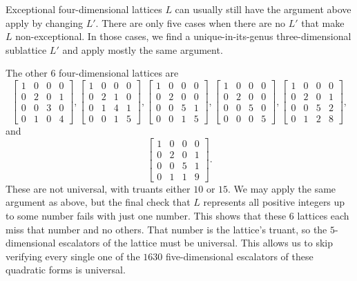 \documentclass{article}
\begin{document}
Exceptional four-dimensional lattices $L$ can usually still have the argument above apply by changing $L'$. There are only five cases when there are no $L'$ that make $L$ non-exceptional. In those cases, we find a unique-in-its-genus three-dimensional sublattice $L'$ and apply mostly the same argument.

The other $6$ four-dimensional lattices are
\[\begin{bmatrix} 1 & 0 & 0 & 0 \\ 0 & 2 & 0 & 1 \\ 0 & 0 & 3 & 0 \\ 0 & 1 & 0 & 4 \end{bmatrix}, \begin{bmatrix} 1 & 0 & 0 & 0 \\ 0 & 2 & 1 & 0 \\ 0 & 1 & 4 & 1 \\ 0 & 0 & 1 & 5 \end{bmatrix}, \begin{bmatrix} 1 & 0 & 0 & 0 \\ 0 & 2 & 0 & 0 \\ 0 & 0 & 5 & 1 \\ 0 & 0 & 1 & 5 \end{bmatrix}, \begin{bmatrix} 1 & 0 & 0 & 0 \\ 0 & 2 & 0 & 0 \\ 0 & 0 & 5 & 0 \\ 0 & 0 & 0 & 5 \end{bmatrix}, \begin{bmatrix} 1 & 0 & 0 & 0 \\ 0 & 2 & 0 & 1 \\ 0 & 0 & 5 & 2 \\ 0 & 1 & 2 & 8 \end{bmatrix},\]
and
\[\begin{bmatrix} 1 & 0 & 0 & 0 \\ 0 & 2 & 0 & 1 \\ 0 & 0 & 5 & 1 \\ 0 & 1 & 1 & 9 \end{bmatrix}.\]
These are not universal, with truants either $10$ or $15$. We may apply the same argument as above, but the final check that $L$ represents all positive integers up to some number fails with just one number. This shows that these $6$ lattices each miss that number and no others. That number is the lattice's truant, so the $5$-dimensional escalators of the lattice must be universal. This allows us to skip verifying every single one of the $1630$ five-dimensional escalators of these quadratic forms is universal.
\end{document}
